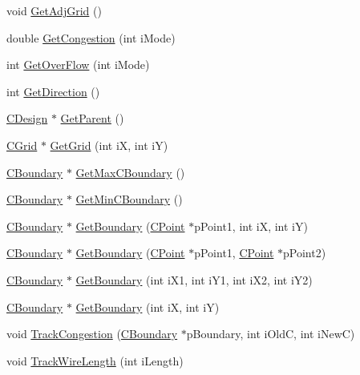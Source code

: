 \begin{DoxyCompactItemize}
\item 
void \mbox{\hyperlink{classCLayer_aa7ddbec19acf0970615b187540d6bad0}{Get\+Adj\+Grid}} ()
\item 
double \mbox{\hyperlink{classCLayer_a1cf9df5ef7dbe809239709f04e0a0cad}{Get\+Congestion}} (int i\+Mode)
\item 
int \mbox{\hyperlink{classCLayer_aef7ab8aa370e9133096e2a66788b7ead}{Get\+Over\+Flow}} (int i\+Mode)
\item 
int \mbox{\hyperlink{classCLayer_a50d4ff62846c5c7f438a0b9e1b3b54e7}{Get\+Direction}} ()
\item 
\mbox{\hyperlink{classCDesign}{C\+Design}} $\ast$ \mbox{\hyperlink{classCLayer_a823b6e80c3ab3f60f7e86cde75c8dec8}{Get\+Parent}} ()
\item 
\mbox{\hyperlink{classCGrid}{C\+Grid}} $\ast$ \mbox{\hyperlink{classCLayer_a1c81a1fe85a0ad9fa4a7cc6a86fec146}{Get\+Grid}} (int iX, int iY)
\item 
\mbox{\hyperlink{classCBoundary}{C\+Boundary}} $\ast$ \mbox{\hyperlink{classCLayer_a652cae101ce82d66873c9c8cae3f24a4}{Get\+Max\+C\+Boundary}} ()
\item 
\mbox{\hyperlink{classCBoundary}{C\+Boundary}} $\ast$ \mbox{\hyperlink{classCLayer_a7d13386d2796be6a0380cba598df5882}{Get\+Min\+C\+Boundary}} ()
\item 
\mbox{\hyperlink{classCBoundary}{C\+Boundary}} $\ast$ \mbox{\hyperlink{classCLayer_abd9462b68d39534ab18b80c89b083f6c}{Get\+Boundary}} (\mbox{\hyperlink{classCPoint}{C\+Point}} $\ast$p\+Point1, int iX, int iY)
\item 
\mbox{\hyperlink{classCBoundary}{C\+Boundary}} $\ast$ \mbox{\hyperlink{classCLayer_a7e70b99323a1449834f7ba6a66f27d30}{Get\+Boundary}} (\mbox{\hyperlink{classCPoint}{C\+Point}} $\ast$p\+Point1, \mbox{\hyperlink{classCPoint}{C\+Point}} $\ast$p\+Point2)
\item 
\mbox{\hyperlink{classCBoundary}{C\+Boundary}} $\ast$ \mbox{\hyperlink{classCLayer_ad69f17c6c80810ffa1527544bc3fc6a7}{Get\+Boundary}} (int i\+X1, int i\+Y1, int i\+X2, int i\+Y2)
\item 
\mbox{\hyperlink{classCBoundary}{C\+Boundary}} $\ast$ \mbox{\hyperlink{classCLayer_a695927bf07f0de927ac6326fbd3f1d00}{Get\+Boundary}} (int iX, int iY)
\item 
void \mbox{\hyperlink{classCLayer_afff67e1cbe36c1bbf689505f3f03064c}{Track\+Congestion}} (\mbox{\hyperlink{classCBoundary}{C\+Boundary}} $\ast$p\+Boundary, int i\+OldC, int i\+NewC)
\item 
void \mbox{\hyperlink{classCLayer_a3b389c13f895286dbe16df369a4f7787}{Track\+Wire\+Length}} (int i\+Length)

\end{DoxyCompactItemize}
